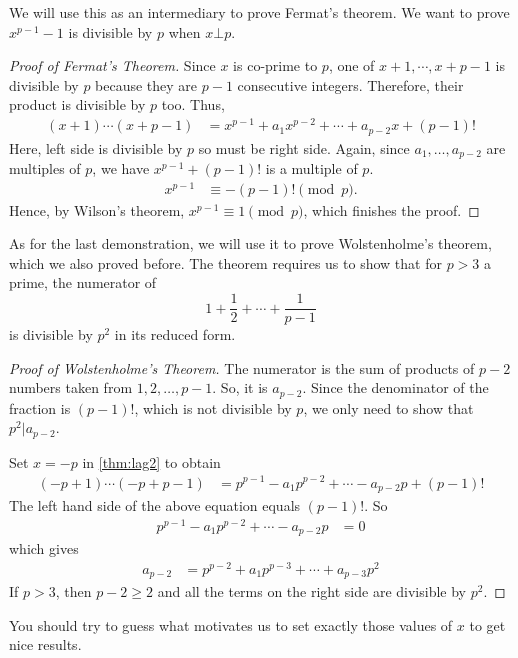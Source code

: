 \documentclass[12pt]{subfile}
\begin{document}
	We will use this as an intermediary to prove Fermat's theorem. We want to prove $x^{p-1}-1$ is divisible by $p$ when $x\bot p$.
		\begin{proof}[Proof of Fermat's Theorem]
			Since $x$ is co-prime to $p$, one of $x+1,\cdots,x+p-1$ is divisible by $p$ because they are $p-1$ consecutive integers. Therefore, their product is divisible by $p$ too. Thus,
				\begin{align*}
					(x+1)\cdots(x+p-1) & = x^{p-1}+a_1x^{p-2}+\cdots+a_{p-2}x+(p-1)!
				\end{align*}
			Here, left side is divisible by $p$ so must be right side. Again, since $a_1,\ldots,a_{p-2}$ are multiples of $p$, we have $x^{p-1}+(p-1)!$ is a multiple of $p$.
				\begin{align*}
					x^{p-1} & \equiv-(p-1)!\pmod p.
				\end{align*}
			Hence, by Wilson's theorem, $x^{p-1} \equiv 1 \pmod p$, which finishes the proof.
		\end{proof}
	As for the last demonstration, we will use it to prove Wolstenholme's theorem, which we also proved before. The theorem requires us to show that for $p>3$ a prime, the numerator of $$1+\dfrac{1}{2}+\cdots+\dfrac{1}{p-1}$$ is divisible by $p^2$ in its reduced form.
		\begin{proof}[Proof of Wolstenholme's Theorem]
			The numerator is the sum of products of $p-2$ numbers taken from $1, 2, \ldots, p-1$. So, it is $a_{p-2}$. Since the denominator of the fraction is $(p-1)!$, which is not divisible by $p$, we only need to show that $p^2|a_{p-2}$.

			Set $x=-p$ in \autoref{thm:lag2} to obtain
				\begin{align*}
					(-p+1)\cdots(-p+p-1)
						& = p^{p-1}-a_1p^{p-2}+\cdots-a_{p-2}p+(p-1)!
				\end{align*}
			The left hand side of the above equation equals $(p-1)!$. So
				\begin{align*}
					p^{p-1}-a_1p^{p-2}+\cdots-a_{p-2}p
						& = 0
				\end{align*}
			which gives
				\begin{align*}
					a_{p-2}
						& = p^{p-2}+a_1p^{p-3}+\cdots+a_{p-3}p^2
				\end{align*}
			If $p>3$, then $p-2\geq 2$ and all the terms on the right side are divisible by $p^2$.
		\end{proof}

		\begin{note}
			You should try to guess what motivates us to set exactly those values of $x$ to get nice results.
		\end{note}
\end{document}
